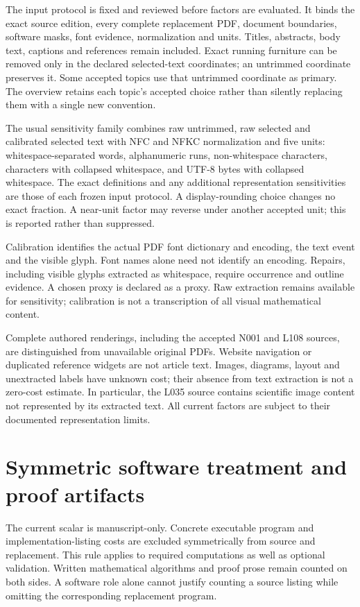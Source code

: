 \documentclass[11pt,a4paper]{article}
\begin{document}
The input protocol is fixed and reviewed before factors are evaluated. It binds
the exact source edition, every complete replacement PDF, document boundaries,
software masks, font evidence, normalization and units. Titles, abstracts,
body text, captions and references remain included. Exact running furniture
can be removed only in the declared selected-text coordinates; an untrimmed
coordinate preserves it. Some accepted topics use that untrimmed coordinate
as primary. The overview retains each topic's accepted choice rather than
silently replacing them with a single new convention.

The usual sensitivity family combines raw untrimmed, raw selected and
calibrated selected text with NFC and NFKC normalization and five units:
whitespace-separated words, alphanumeric runs, non-whitespace characters,
characters with collapsed whitespace, and UTF-8 bytes with collapsed whitespace.
The exact definitions and any additional representation sensitivities are those
of each frozen input protocol. A display-rounding choice changes no exact
fraction. A near-unit factor may reverse under another accepted unit; this is
reported rather than suppressed.

Calibration identifies the actual PDF font dictionary and encoding, the text
event and the visible glyph. Font names alone need not identify an encoding.
Repairs, including visible glyphs extracted as whitespace, require occurrence
and outline evidence. A chosen proxy is declared as a proxy. Raw extraction
remains available for sensitivity; calibration is not a transcription of all
visual mathematical content.

Complete authored renderings, including the accepted N001 and L108 sources,
are distinguished from unavailable original PDFs. Website navigation or
duplicated reference widgets are not article text. Images, diagrams, layout and
unextracted labels have unknown cost; their absence from text extraction is not
a zero-cost estimate. In particular, the L035 source contains scientific image
content not represented by its extracted text. All current factors are subject
to their documented representation limits.

\section{Symmetric software treatment and proof artifacts}

The current scalar is manuscript-only. Concrete executable program and
implementation-listing costs are excluded symmetrically from source and
replacement. This rule applies to required computations as well as optional
validation. Written mathematical algorithms and proof prose remain counted on
both sides. A software role alone cannot justify counting a source listing
while omitting the corresponding replacement program.
\end{document}

